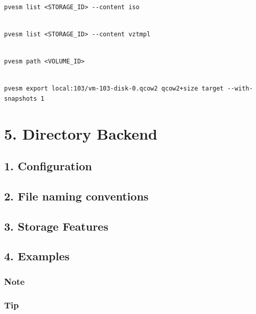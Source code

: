\begin{lstlisting}

pvesm list <STORAGE_ID> --content iso

\end{lstlisting}

\begin{lstlisting}

pvesm list <STORAGE_ID> --content vztmpl

\end{lstlisting}

\begin{lstlisting}

pvesm path <VOLUME_ID>

\end{lstlisting}

\begin{lstlisting}

pvesm export local:103/vm-103-disk-0.qcow2 qcow2+size target --with-snapshots 1

\end{lstlisting}


\section{5. Directory Backend}

\subsection{1. Configuration}

\subsection{2. File naming conventions}

\subsection{3. Storage Features}

\subsection{4. Examples}

\subsubsection{Note}

\subsubsection{Tip}


